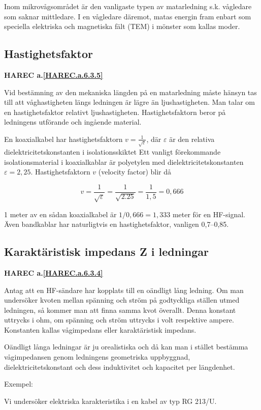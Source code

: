 Inom mikrovågsområdet är den vanligaste typen av matarledning
s.k. vågledare som saknar mittledare. I en vågledare däremot, matas
energin fram enbart som speciella elektriska och magnetiska fält (TEM)
i mönster som kallas moder.

\subsection{Hastighetsfaktor}
\textbf{
HAREC a.\ref{HAREC.a.6.3.5}\label{myHAREC.a.6.3.5}
}

Vid bestämning av den mekaniska längden på en matarledning måste
hänsyn tas till att våghastigheten längs ledningen är lägre än
ljushastigheten. Man talar om en hastighetsfaktor relativt
ljushastigheten. Hastighetsfaktorn beror på ledningens utförande och
ingående material.

En koaxialkabel har hastighetsfaktorn \(v =
\frac{1}{\sqrt{\varepsilon}}\), där \(\varepsilon\) är den relativa
dielektricitetskonstanten i isolationsskiktet Ett vanligt förekommande
isolationsmaterial i koaxialkablar är polyetylen med
dielektricitetskonstanten \(\varepsilon = 2,25\).  Hastighetsfaktorn
\(v\) (velocity factor) blir då

\[
v = \frac{1}{\sqrt{\varepsilon}} = \frac{1}{\sqrt{2.25}} = \frac{1}{1,5} = 0,666
\]

1 meter av en sådan koaxialkabel är \(1/0,666 = 1,333\) meter för en
HF-signal.  Även bandkablar har naturligtvis en hastighetsfaktor,
vanligen 0,7--0,85.

\subsection{Karaktäristisk impedans Z i ledningar}
\textbf{
HAREC a.\ref{HAREC.a.6.3.4}\label{myHAREC.a.6.3.4}
}

Antag att en HF-sändare har kopplats till en oändligt lång ledning. Om
man undersöker kvoten mellan spänning och ström på godtyckliga ställen
utmed ledningen, så kommer man att finna samma kvot överallt.  Denna
konstant uttrycks i ohm, om spänning och ström uttrycks i volt
respektive ampere. Konstanten kallas vågimpedans eller karaktäristisk
impedans.

Oändligt långa ledningar är ju orealistiska och då kan man i stället
bestämma vågimpedansen genom ledningens geometriska uppbyggnad,
dielektricitetskonstant och dess induktivitet och kapacitet per
längdenhet.

Exempel:

Vi undersöker elektriska karakteristika i en kabel av typ RG 213/U.

